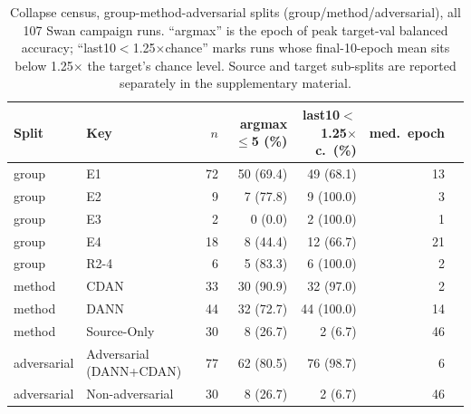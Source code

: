 \begin{table}[t]
\centering
\caption{Collapse census, group-method-adversarial splits (group/method/adversarial), all 107 Swan campaign runs. ``argmax'' is the epoch of peak target-val balanced accuracy; ``last10$<$1.25$\times$chance'' marks runs whose final-10-epoch mean sits below 1.25$\times$ the target's chance level. Source and target sub-splits are reported separately in the supplementary material.}
\label{tab:collapse_census_group_method_adversarial}
\footnotesize
\setlength{\tabcolsep}{3pt}
\begin{tabular}{llrrrrr}
\toprule
Split & Key & $n$ & argmax$\leq$5 (\%) & last10$<$1.25$\times$c.\ (\%) & med.\ epoch \\
\midrule
group & E1 & 72 & 50 (69.4) & 49 (68.1) & 13 \\
group & E2 & 9 & 7 (77.8) & 9 (100.0) & 3 \\
group & E3 & 2 & 0 (0.0) & 2 (100.0) & 1 \\
group & E4 & 18 & 8 (44.4) & 12 (66.7) & 21 \\
group & R2-4 & 6 & 5 (83.3) & 6 (100.0) & 2 \\
\midrule
method & CDAN & 33 & 30 (90.9) & 32 (97.0) & 2 \\
method & DANN & 44 & 32 (72.7) & 44 (100.0) & 14 \\
method & Source-Only & 30 & 8 (26.7) & 2 (6.7) & 46 \\
\midrule
adversarial & Adversarial (DANN+CDAN) & 77 & 62 (80.5) & 76 (98.7) & 6 \\
adversarial & Non-adversarial & 30 & 8 (26.7) & 2 (6.7) & 46 \\
\bottomrule
\end{tabular}
\end{table}

